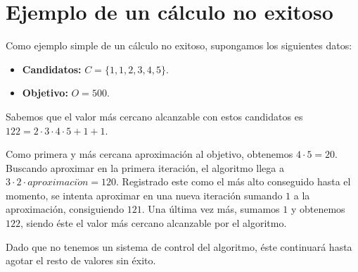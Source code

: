 \chapter{Ejemplo de un cálculo no exitoso}

Como ejemplo simple de un cálculo no exitoso, supongamos los siguientes datos:

\begin{itemize}
	\item\textbf{Candidatos:} $C=\{1,1,2,3,4,5\}$.
	\item\textbf{Objetivo:} $O=500$.
\end{itemize}

Sabemos que el valor más cercano alcanzable con estos candidatos es $122=2\cdot3\cdot4\cdot5+1+1$.

Como primera y más cercana aproximación al objetivo, obtenemos $4\cdot5=20$.
Buscando aproximar en la primera iteración, el algoritmo llega a $3\cdot2\cdot aproximaci\acute on=120$.
Registrado este  como el más alto conseguido hasta el momento, se intenta aproximar en una nueva iteración sumando $1$ a la aproximación, consiguiendo $121$.
Una última vez más, sumamos $1$ y obtenemos $122$, siendo éste el valor más cercano alcanzable por el algoritmo.

Dado que no tenemos un sistema de control del algoritmo, éste continuará hasta agotar el resto de valores sin éxito.


